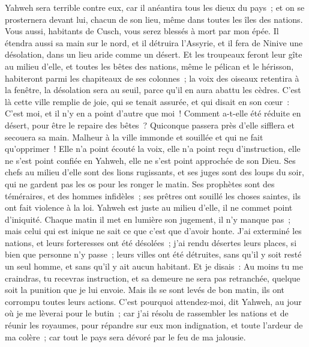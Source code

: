 \begin{multicols}{2}
Yahweh sera terrible contre eux, car il anéantira tous les dieux du pays~; et on se prosternera devant lui, chacun de son lieu, même dans toutes les îles des nations.
Vous aussi, habitants de Cusch, vous serez blessés à mort par mon épée.
Il étendra aussi sa main sur le nord, et il détruira l'Assyrie, et il fera de Ninive une désolation, dans un lieu aride comme un désert.
Et les troupeaux feront leur gîte au milieu d'elle, et toutes les bêtes des nations, même le pélican et le hérisson, habiteront parmi les chapiteaux de ses colonnes~; la voix des oiseaux retentira à la fenêtre, la désolation sera au seuil, parce qu'il en aura abattu les cèdres.
C'est là cette ville remplie de joie, qui se tenait assurée, et qui disait en son cœur~: C'est moi, et il n'y en a point d'autre que moi~! Comment a-t-elle été réduite en désert, pour être le repaire des bêtes~? Quiconque passera près d'elle sifflera et secouera sa main.
\VerseOne{}Malheur à la ville immonde et souillée et qui ne fait qu'opprimer~!
Elle n'a point écouté la voix, elle n'a point reçu d'instruction, elle ne s'est point confiée en Yahweh, elle ne s'est point approchée de son Dieu.
Ses chefs au milieu d'elle sont des lions rugissants, et ses juges sont des loups du soir, qui ne gardent pas les os pour les ronger le matin.
Ses prophètes sont des téméraires, et des hommes infidèles~; ses prêtres ont souillé les choses saintes, ils ont fait violence à la loi.
Yahweh est juste au milieu d'elle, il ne commet point d'iniquité. Chaque matin il met en lumière son jugement, il n'y manque pas~; mais celui qui est inique ne sait ce que c'est que d'avoir honte.
J'ai exterminé les nations, et leurs forteresses ont été désolées~; j'ai rendu désertes leurs places, si bien que personne n'y passe~; leurs villes ont été détruites, sans qu'il y soit resté un seul homme, et sans qu'il y ait aucun habitant.
Et je disais~: Au moins tu me craindras, tu recevras instruction, et sa demeure ne sera pas retranchée, quelque soit la punition que je lui envoie. Mais ils se sont levés de bon matin, ils ont corrompu toutes leurs actions.
C'est pourquoi attendez-moi, dit Yahweh, au jour où je me lèverai pour le butin~; car j'ai résolu de rassembler les nations et de réunir les royaumes, pour répandre sur eux mon indignation, et toute l'ardeur de ma colère~; car tout le pays sera dévoré par le feu de ma jalousie.

\end{multicols}
